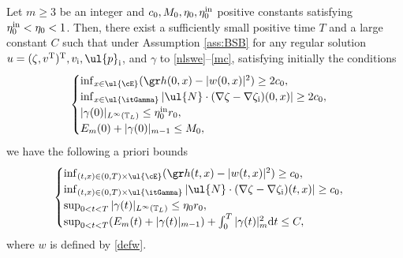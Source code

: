 \begin{theorem}\label{th:main}
Let $m\geq3$ be an integer and $c_0, M_0, \eta_0, \eta_0^{\rm in}$ positive constants satisfying $\eta_0^{\rm in}<\eta_0<1$.
Then, there exist a sufficiently small positive time $T$ and a large constant $C$ such that under Assumption \ref{ass:BSB} for any regular solution
$u=(\zeta,v^{\rm T})^{\rm T},v_\mathrm{i},\ul{p}_\mathrm{i}$, and $\gamma$ to \eqref{nlswe}--\eqref{mc}, satisfying initially the conditions
\begin{equation}\label{EstIni}
\begin{cases}
\inf_{x\in\ul{\cE}}(\gr h(0,x)-|w(0,x)|^2) \geq 2c_0, \\
\inf_{x\in\ul{\itGamma}}| \ul{N}\cdot(\nabla\zeta-\nabla\zeta_\mathrm{i})(0,x)| \geq 2c_0, \\
|\gamma(0)|_{L^\infty(\mathbb{T}_L)} \leq \eta_0^{\rm in}r_0, \\
E_m(0) + |\gamma(0)|_{m-1} \leq M_0,
\end{cases}
\end{equation}
we have the following a priori bounds
\begin{equation}\label{APE}
\begin{cases}
\inf_{(t,x)\in(0,T)\times\ul{\cE}}(\gr h(t,x)-|w(t,x)|^2) \geq c_0, \\
\inf_{(t,x)\in(0,T)\times\ul{\itGamma}}| \ul{N}\cdot(\nabla\zeta-\nabla\zeta_\mathrm{i})(t,x)| \geq c_0, \\
\sup_{0<t<T}|\gamma(t)|_{L^\infty(\mathbb{T}_L)} \leq \eta_0r_0, \\
\sup_{0<t<T}(E_m(t) + |\gamma(t)|_{m-1}) + \int_0^T|\gamma(t)|_m^2{\rm d}t \leq C,
\end{cases}
\end{equation}
where $w$ is defined by \eqref{defw}.
\end{theorem}

